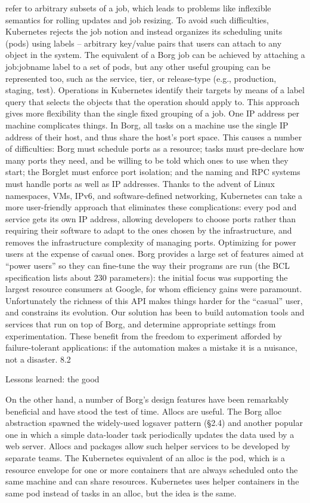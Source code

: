 refer to arbitrary subsets of a job, which leads to problems
like inflexible semantics for rolling updates and job resizing.
To avoid such difficulties, Kubernetes rejects the job notion and instead organizes its scheduling units (pods) using
labels – arbitrary key/value pairs that users can attach to any
object in the system. The equivalent of a Borg job can be
achieved by attaching a job:jobname label to a set of pods,
but any other useful grouping can be represented too, such
as the service, tier, or release-type (e.g., production, staging, test). Operations in Kubernetes identify their targets by
means of a label query that selects the objects that the operation should apply to. This approach gives more flexibility
than the single fixed grouping of a job.
One IP address per machine complicates things. In
Borg, all tasks on a machine use the single IP address of
their host, and thus share the host’s port space. This causes
a number of difficulties: Borg must schedule ports as a resource; tasks must pre-declare how many ports they need,
and be willing to be told which ones to use when they start;
the Borglet must enforce port isolation; and the naming and
RPC systems must handle ports as well as IP addresses.
Thanks to the advent of Linux namespaces, VMs, IPv6,
and software-defined networking, Kubernetes can take a
more user-friendly approach that eliminates these complications: every pod and service gets its own IP address, allowing
developers to choose ports rather than requiring their software to adapt to the ones chosen by the infrastructure, and
removes the infrastructure complexity of managing ports.
Optimizing for power users at the expense of casual
ones. Borg provides a large set of features aimed at “power
users” so they can fine-tune the way their programs are run
(the BCL specification lists about 230 parameters): the initial focus was supporting the largest resource consumers at
Google, for whom efficiency gains were paramount. Unfortunately the richness of this API makes things harder for the
“casual” user, and constrains its evolution. Our solution has
been to build automation tools and services that run on top of
Borg, and determine appropriate settings from experimentation. These benefit from the freedom to experiment afforded
by failure-tolerant applications: if the automation makes a
mistake it is a nuisance, not a disaster.
8.2

Lessons learned: the good

On the other hand, a number of Borg’s design features have
been remarkably beneficial and have stood the test of time.
Allocs are useful. The Borg alloc abstraction spawned
the widely-used logsaver pattern (§2.4) and another popular
one in which a simple data-loader task periodically updates
the data used by a web server. Allocs and packages allow
such helper services to be developed by separate teams. The
Kubernetes equivalent of an alloc is the pod, which is a
resource envelope for one or more containers that are always
scheduled onto the same machine and can share resources.
Kubernetes uses helper containers in the same pod instead
of tasks in an alloc, but the idea is the same.


